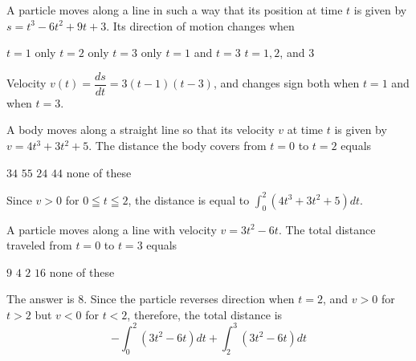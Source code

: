 


\question
A particle moves along a line in such a way that its position at time $t$ is given by $s=t^{3}-6 t^{2}+9 t+3$. Its direction of motion changes when
\begin{choices}
  \choice $t=1$ only
  \choice $t=2$ only
  \choice $t=3$ only
  \CorrectChoice $t=1$ and $t=3$
  \choice $t=1,2$, and 3
\end{choices}
\begin{solution}
Velocity $v(t)=\dfrac{d s}{d t}=3(t-1)(t-3)$, and changes sign both when $t=1$ and when $t=3$.
\end{solution}

\question
A body moves along a straight line so that its velocity $v$ at time $t$ is given by $v=4 t^{3}+3 t^{2}+5$. The distance the body covers from $t=0$ to $t=2$ equals
\begin{choices}
  \CorrectChoice $34$
  \choice $55$
  \choice $24$
  \choice $44$
  \choice none of these
\end{choices}
\begin{solution}
Since $v>0$ for $0 \leqq t \leqq 2$, the distance is equal to $\int_{0}^{2}\left(4 t^{3}+3 t^{2}+5\right) d t$.
\end{solution}

\question\label{calc08:particle-v}
A particle moves along a line with velocity $v=3 t^{2}-6 t$. The total distance traveled from $t=0$ to $t=3$ equals
\begin{choices}
  \choice $9$
  \choice $4$
  \choice $2$
  \choice $16$
  \CorrectChoice none of these
\end{choices}
\begin{solution}
The answer is $8$. Since the particle reverses direction when $t=2$, and $v>0$ for $t>2$ but $v<0$ for $t<2$, therefore, the total distance is
\[
-\int_{0}^{2}\left(3 t^{2}-6 t\right) d t+\int_{2}^{3}\left(3 t^{2}-6 t\right) d t
\]
\end{solution}



